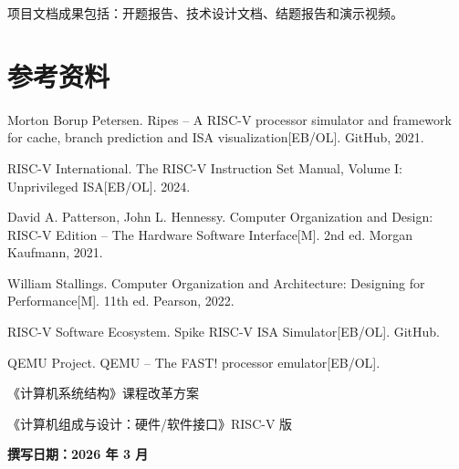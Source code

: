 \documentclass[12pt, a4paper]{article}
\begin{document}
项目文档成果包括：开题报告、技术设计文档、结题报告和演示视频。

\vspace{1cm}

\section{参考资料}\label{sec:ref}

\begin{enumerate}[leftmargin=*, label={[\arabic*]}]
\item Morton Borup Petersen. Ripes -- A RISC-V processor simulator and framework for cache, branch prediction and ISA visualization[EB/OL]. GitHub, 2021.
\item RISC-V International. The RISC-V Instruction Set Manual, Volume I: Unprivileged ISA[EB/OL]. 2024.
\item David A. Patterson, John L. Hennessy. Computer Organization and Design: RISC-V Edition -- The Hardware Software Interface[M]. 2nd ed. Morgan Kaufmann, 2021.
\item William Stallings. Computer Organization and Architecture: Designing for Performance[M]. 11th ed. Pearson, 2022.
\item RISC-V Software Ecosystem. Spike RISC-V ISA Simulator[EB/OL]. GitHub.
\item QEMU Project. QEMU -- The FAST! processor emulator[EB/OL].
\item 《计算机系统结构》课程改革方案
\item 《计算机组成与设计：硬件/软件接口》RISC-V 版
\end{enumerate}

\vspace{2cm}

\begin{center}
\textbf{撰写日期：2026 年 3 月}
\end{center}
\end{document}
